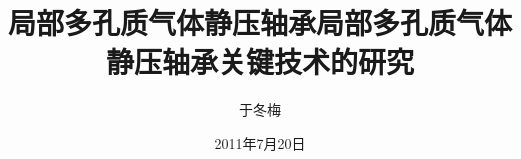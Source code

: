 
\subject{机械制造及其自动化}
\author{于冬梅}
\date{2011年7月20日}

\ifxueweidoctor
  \title{局部多孔质气体静压轴承} %
\fi
\ifxueweimaster
  \title{局部多孔质气体静压轴承关键技术的研究}
\fi

\makecover
\clearpage
\setcounter{page}{1} 